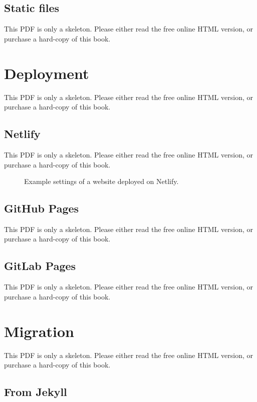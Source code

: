 \documentclass[
  12pt,
]{krantz}
\begin{document}
\section{Static files}\label{static-files}

This PDF is only a skeleton. Please either read the free online HTML version, or purchase a hard-copy of this book.

\chapter{Deployment}\label{deployment}

This PDF is only a skeleton. Please either read the free online HTML version, or purchase a hard-copy of this book.

\section{Netlify}\label{netlify}

This PDF is only a skeleton. Please either read the free online HTML version, or purchase a hard-copy of this book.

\begin{figure}\caption{Example settings of a website deployed on Netlify.}\end{figure}

\section{GitHub Pages}\label{github-pages}

This PDF is only a skeleton. Please either read the free online HTML version, or purchase a hard-copy of this book.

\section{GitLab Pages}\label{gitlab-pages}

This PDF is only a skeleton. Please either read the free online HTML version, or purchase a hard-copy of this book.

\chapter{Migration}\label{migration}

This PDF is only a skeleton. Please either read the free online HTML version, or purchase a hard-copy of this book.

\section{From Jekyll}\label{from-jekyll}
\end{document}
